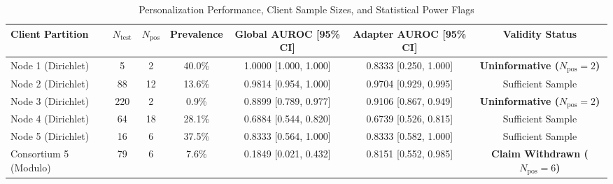 \begin{table}[t]
\centering
\caption{Personalization Performance, Client Sample Sizes, and Statistical Power Flags}
\label{tab:personalization_results}
\begin{tabular}{lcccccc}
\hline
\textbf{Client Partition} & $N_{\text{test}}$ & $N_{\text{pos}}$ & \textbf{Prevalence} & \textbf{Global AUROC [95\% CI]} & \textbf{Adapter AUROC [95\% CI]} & \textbf{Validity Status} \\
\hline
Node 1 (Dirichlet) & 5 & 2 & 40.0\% & 1.0000 [1.000, 1.000] & 0.8333 [0.250, 1.000] & \textbf{Uninformative ($N_{\text{pos}}=2$)} \\
Node 2 (Dirichlet) & 88 & 12 & 13.6\% & 0.9814 [0.954, 1.000] & 0.9704 [0.929, 0.995] & Sufficient Sample \\
Node 3 (Dirichlet) & 220 & 2 & 0.9\% & 0.8899 [0.789, 0.977] & 0.9106 [0.867, 0.949] & \textbf{Uninformative ($N_{\text{pos}}=2$)} \\
Node 4 (Dirichlet) & 64 & 18 & 28.1\% & 0.6884 [0.544, 0.820] & 0.6739 [0.526, 0.815] & Sufficient Sample \\
Node 5 (Dirichlet) & 16 & 6 & 37.5\% & 0.8333 [0.564, 1.000] & 0.8333 [0.582, 1.000] & Sufficient Sample \\
\hline
Consortium 5 (Modulo) & 79 & 6 & 7.6\% & 0.1849 [0.021, 0.432] & 0.8151 [0.552, 0.985] & \textbf{Claim Withdrawn ($N_{\text{pos}}=6$)} \\
\hline
\end{tabular}
\end{table}
